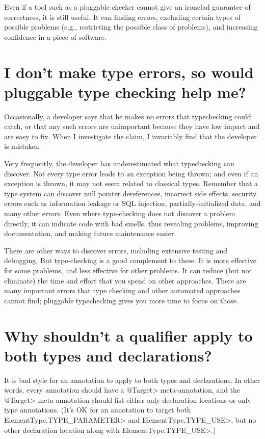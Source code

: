 
Even if a tool such as a pluggable checker cannot give an ironclad
guarantee of correctness, it is still useful.  It can finding errors, 
excluding certain types of possible problems (e.g., restricting the
possible class of problems), and increasing confidence in a piece of
software.


\section{I don't make type errors, so would pluggable type checking help me?\label{never-make-type-errors}}

Occasionally, a developer says that he makes no errors that typechecking
could catch, or that any such errors are unimportant because they have low
impact and are easy to fix.  When I investigate the claim, I invariably
find that the developer is mistaken.

Very frequently, the developer has underestimated what typechecking can
discover.  Not every type error leads to an exception being thrown; and
even if an exception is thrown, it may not seem related to classical types.
Remember that a type system can discover
null pointer dereferences,
incorrect side effects, 
security errors such as information leakage or SQL injection,
partially-initialized data,
and many other errors.  Even where type-checking does not discover a
problem directly, it can indicate code with bad smells, thus revealing
problems, improving documentation, and making future maintenance easier.

There are other ways to discover errors, including extensive testing and
debugging.  But type-checking is a good complement to these.  It is more
effective for some problems, and less effective for other problems.  It can
reduce (but not eliminate) the time and effort that you spend on other
approaches.  There are many important errors that type checking and other
automated approaches cannot find; pluggable typechecking gives you more
time to focus on those.


\section{Why shouldn't a qualifier apply to both types and declarations?\label{faq-no-annotation-on-types-and-declarations}}

It is bad style for an annotation to apply to both types and declarations.
In other words, every annotation should have a \<@Target> meta-annotation,
and the \<@Target> meta-annotation should list either only declaration
locations or only type annotations.  (It's OK for an annotation to target
both \<ElementType.TYPE\_PARAMETER> and \<ElementType.TYPE\_USE>, but no
other declaration location along with \<ElementType.TYPE\_USE>.)

